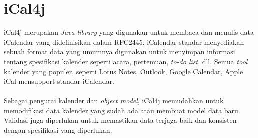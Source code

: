 \section{iCal4j}
\label{sec:iCal4j}
iCal4j merupakan \textit{Java library} yang digunakan untuk membaca dan menulis data iCalendar yang didefinisikan dalam RFC2445. iCalendar standar menyediakan sebuah format data yang umumnya digunakan untuk menyimpan informasi tentang spesifikasi kalender seperti acara, pertemuan, \textit{to-do list}, dll. Semua \textit{tool} kalender yang populer, seperti Lotus Notes, Outlook, Google Calendar, Apple iCal mensupport standar iCalendar.\cite{ical2}
\\ \\
Sebagai pengurai kalender dan \textit{object model}, iCal4j memudahkan untuk memodifikasi data kalender yang sudah ada atau membuat model data baru. Validasi juga diperlukan untuk memastikan data terjaga baik dan konsisten dengan spesifikasi yang diperlukan.\cite{ical2}


